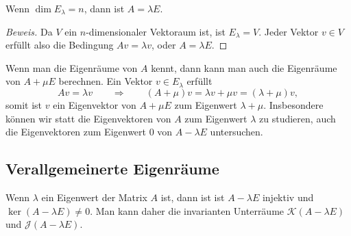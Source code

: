 \begin{satz}
Wenn $\dim E_\lambda=n$, dann ist $A=\lambda E$.
\end{satz}

\begin{proof}[Beweis]
Da $V$ ein $n$-dimensionaler Vektoraum ist, ist $E_\lambda=V$.
Jeder Vektor $v\in V$ erfüllt also die Bedingung $Av=\lambda v$,
oder $A=\lambda E$.
\end{proof}

Wenn man die Eigenräume von $A$ kennt, dann kann man auch die Eigenräume
von $A+\mu E$ berechnen.
Ein Vektor $v\in E_\lambda$ erfüllt
\[
Av=\lambda v
\qquad\Rightarrow\qquad
(A+\mu)v = \lambda v + \mu v
=
(\lambda+\mu)v,
\]
somit ist $v$ ein Eigenvektor von $A+\mu E$ zum Eigenwert $\lambda+\mu$.
Insbesondere können wir statt die Eigenvektoren von $A$ zum Eigenwert $\lambda$
zu studieren, auch die Eigenvektoren zum Eigenwert $0$ von $A-\lambda E$
untersuchen.

%
%
\subsection{Verallgemeinerte Eigenräume
\label{buch:subsection:verallgemeinerte-eigenraeume}}
Wenn $\lambda$ ein Eigenwert der Matrix $A$ ist, dann ist
ist $A-\lambda E$ injektiv und $\ker(A-\lambda E)\ne 0$.
Man kann daher die invarianten Unterräume $\mathcal{K}(A-\lambda E)$
und $\mathcal{J}(A-\lambda E)$.

